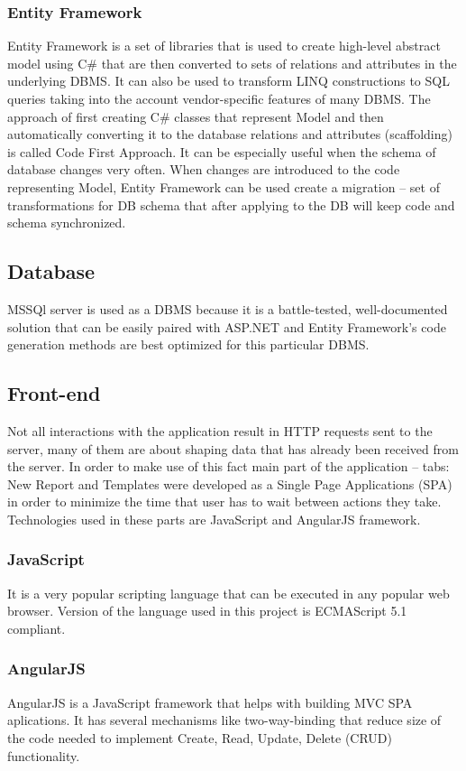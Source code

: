 \documentclass[12pt, twoside, openany]{report}
\theoremstyle{definition}
\begin{document}
\subsubsection{Entity Framework}
Entity Framework is a set of libraries that is used to create high-level abstract model using C\# that are then converted to sets of relations and attributes in the underlying DBMS. It can also be used to transform LINQ constructions to SQL queries taking into the account vendor-specific features of many DBMS.
The approach of first creating C\# classes that represent Model and then automatically converting it to the database relations and attributes (scaffolding) is called Code First Approach. It can be especially useful when the schema of database changes very often. When changes are introduced to the code representing Model, Entity Framework can be used create a migration  -- set of transformations for DB schema that after applying to the DB will keep code and schema synchronized. 

\subsection{Database}
MSSQl server is used as a DBMS because it is a battle-tested, well-documented solution that can be easily paired with ASP.NET and Entity Framework's code generation methods are best optimized for this particular DBMS. 

\subsection{Front-end}
Not all interactions with the application result in HTTP requests sent to the server, many of them are about shaping data that has already been received from the server. In order to make use of this fact main part of the application -- tabs: New Report and Templates were developed as a Single Page Applications (SPA) in order to minimize the time that user has to wait between actions they take. Technologies used in these parts are JavaScript and AngularJS framework. 

\subsubsection{JavaScript}
It is a very popular scripting language that can be executed in any popular web browser. Version of the language used in this project is ECMAScript 5.1 compliant. 
\subsubsection{AngularJS}
AngularJS is a JavaScript framework that helps with building MVC SPA aplications. It has several mechanisms like two-way-binding that reduce size of the code needed to implement Create, Read, Update, Delete (CRUD) functionality.
\end{document}
